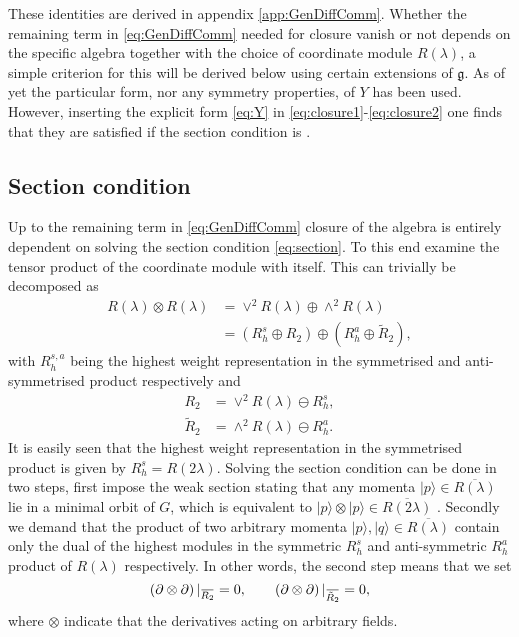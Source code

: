 These identities are derived in appendix \ref{app:GenDiffComm}. Whether the remaining term in \eqref{eq:GenDiffComm} needed for closure vanish or not depends on the specific algebra together with the choice of coordinate module $R(\lambda)$, a simple criterion for this will be derived below using certain extensions of $\mathfrak{g}$. As of yet the particular form, nor any symmetry properties, of $Y$ has been used. However, inserting the explicit form \eqref{eq:Y} in \eqref{eq:closure1}-\eqref{eq:closure2} one finds that they are satisfied if the section condition is \cite{Palmkvist2015ExpGeomSuperAlg}.

\subsection{Section condition}
Up to the remaining term in \eqref{eq:GenDiffComm} closure of the algebra is entirely dependent on solving the section condition \eqref{eq:section}. To this end examine the tensor product of the coordinate module with itself. This can trivially be decomposed as
\begin{equation}\label{eq:SectionConditionReps}
    \begin{aligned}
        R(\lambda)\otimes R(\lambda) &= \vee^2 R(\lambda)\oplus \wedge^2R(\lambda)\\
        &= \left(R_h^s\oplus R_2\right)\oplus\left(R_h^a\oplus \tilde{R}_2\right),
    \end{aligned}
\end{equation}
with $R_h^{s,a}$ being the highest weight representation in the symmetrised and anti-symmetrised product respectively and
\begin{align}
    R_2 &= \vee^2 R(\lambda)\ominus R_h^s,\\
    \tilde{R}_2 &= \wedge^2R(\lambda)\ominus  R_h^a.
\end{align}
It is easily seen that the highest weight representation in the symmetrised product is given by $R_h^s=R(2\lambda)$. Solving the section condition can be done in two steps, first impose the weak section stating that any momenta $|p\rangle\in \overbar{R(\lambda)}$ lie in a minimal orbit of $G$, which is equivalent to $|p\rangle\otimes|p\rangle \in \overbar{R(2\lambda)}$ \cite{Berman2013,Bossard2017}. Secondly we demand that the product of two arbitrary momenta $|p\rangle,|q\rangle\in\overbar{R(\lambda)}$ contain only the dual of the highest modules in the symmetric $R^s_h$ and anti-symmetric $R^a_h$ product of $R(\lambda)$ respectively. In other words, the second step means that we set 
\begin{equation}
    \left(\pd\otimes\pd\right)|_{\overbar{R_2}} = 0, \qquad \left(\pd\otimes\pd\right)|_{\overbar{\tilde{R}_2}} =0,
\end{equation}
where $\otimes$ indicate that the derivatives acting on arbitrary fields. 


